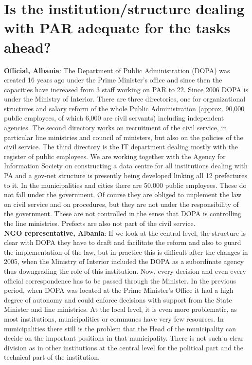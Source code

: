 \section{Is the institution/structure dealing with PAR adequate for the tasks ahead? }
\label{sec:par ahead}
\textbf{Official, Albania}: The Department of Public Administration (DOPA) was created 16 years ago under the Prime Minister’s office and since then the capacities have increased from 3 staff working on PAR to 22. Since 2006 DOPA is under the Ministry of Interior. There are three directories, one for organizational structures and salary reform of the whole Public Administration (approx. 90,000 public employees, of which 6,000 are civil servants) including independent agencies. The second directory works on recruitment of the civil service, in particular line ministries and council of ministers, but also on the policies of the civil service. The third directory is the IT department dealing mostly with the register of public employees. We are working together with the Agency for Information Society on constructing a data centre for all institutions dealing with PA and a gov-net structure is presently being developed linking all 12 prefectures to it. In the municipalities and cities there are 50,000 public employees. These do not fall under the government. Of course they are obliged to implement the law on civil service and on procedures, but they are not under the responsibility of the government. These are not controlled in the sense that DOPA is controlling the line ministries. Prefects are also not part of the civil service.\\
\textbf{NGO representative, Albania}: If we look at the central level, the structure is clear with DOPA they have to draft and facilitate the reform and also to guard the implementation of the law, but in practice this is difficult after the changes in 2005, when the Ministry of Interior included the DOPA as a subordinate agency thus downgrading the role of this institution. Now, every decision and even every official correspondence has to be passed through the Minister. In the previous period, when DOPA was located at the Prime Minister’s Office it had a high degree of autonomy and could enforce decisions with support from the State Minister and line ministries. At the local level, it is even more problematic, as most institutions, municipalities or communes have very few resources. In municipalities there still is the problem that the Head of the municipality can decide on the important positions in that municipality. There is not such a clear division as in other institutions at the central level for the political part and the technical part of the institution. \\
